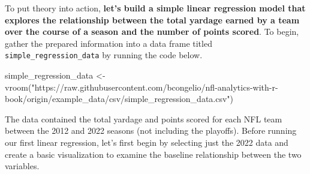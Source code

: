 \documentclass[
  letterpaper,
]{krantz}
\newenvironment{Shaded}{\begin{snugshade}}{\end{snugshade}}
\newcommand{\FunctionTok}[1]{\textcolor[rgb]{0.28,0.35,0.67}{#1}}
\newcommand{\NormalTok}[1]{\textcolor[rgb]{0.00,0.23,0.31}{#1}}
\newcommand{\OtherTok}[1]{\textcolor[rgb]{0.00,0.23,0.31}{#1}}
\newcommand{\StringTok}[1]{\textcolor[rgb]{0.13,0.47,0.30}{#1}}
\begin{document}
To put theory into action, \textbf{let's build a simple linear
regression model that explores the relationship between the total
yardage earned by a team over the course of a season and the number of
points scored}. To begin, gather the prepared information into a data
frame titled \texttt{simple\_regression\_data} by running the code
below.

\begin{Shaded}
\begin{Highlighting}[]
\NormalTok{simple\_regression\_data }\OtherTok{\textless{}{-}}
  \FunctionTok{vroom}\NormalTok{(}\StringTok{"https://raw.githubusercontent.com/bcongelio/nfl{-}analytics{-}with{-}r{-}book/origin/example\_data/csv/simple\_regression\_data.csv"}\NormalTok{)}
\end{Highlighting}
\end{Shaded}

The data contained the total yardage and points scored for each NFL team
between the 2012 and 2022 seasons (not including the playoffs). Before
running our first linear regression, let's first begin by selecting just
the 2022 data and create a basic visualization to examine the baseline
relationship between the two variables.
\end{document}

